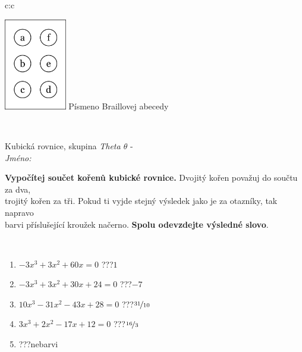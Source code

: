 \documentclass[10pt]{report}
\begin{document}
\begin{tabular}{c:c}
\begin{minipage}[c][104.5mm][t]{0.5\linewidth}
\begin{center}
\begin{minipage}{0.20\linewidth}
\begin{center}
\includegraphics[height=40mm]{../images/braille.png}
{\small Písmeno Braillovej abecedy}
\end{center}
\end{minipage}
\end{center}
\end{minipage}
\\ \hdashline
\begin{minipage}[c][104.5mm][t]{0.5\linewidth}
\begin{center}
\vspace{7mm}
{\huge Kubická rovnice, skupina \textit{Theta $\theta$} -}\\[5mm]
\textit{Jméno:}\phantom{xxxxxxxxxxxxxxxxxxxxxxxxxxxxxxxxxxxxxxxxxxxxxxxxxxxxxxxxxxxxxxxxx}\\[5mm]
\begin{minipage}{0.95\linewidth}
\begin{center}
\textbf{Vypočítej součet kořenů kubické rovnice.} Dvojitý kořen považuj do součtu za dva,\\trojitý kořen za tři. Pokud ti vyjde stejný výsledek jako je za otazníky, tak napravo\\barvi příslušející kroužek načerno. \textbf{Spolu odevzdejte výsledné slovo}.
\end{center}
\end{minipage}
\\[1mm]
\begin{minipage}{0.79\linewidth}
\begin{center}
\begin{varwidth}{\linewidth}
\begin{enumerate}
\Large
\item $-3x^3+3x^2+60x=0$\quad \dotfill\; ???\;\dotfill \quad $1$
\item $-3x^3+3x^2+30x+24=0$\quad \dotfill\; ???\;\dotfill \quad $-7$
\item $10x^3-31x^2-43x+28=0$\quad \dotfill\; ???\;\dotfill \quad $\nicefrac{31}{10}$
\item $3x^3+2x^2-17x+12=0$\quad \dotfill\; ???\;\dotfill \quad $\nicefrac{16}{3}$
\item \quad \dotfill\; ???\;\dotfill \quad nebarvi

\end{enumerate}
\end{varwidth}
\end{center}
\end{minipage}
\end{center}
\end{minipage}
\end{tabular}
\end{document}
